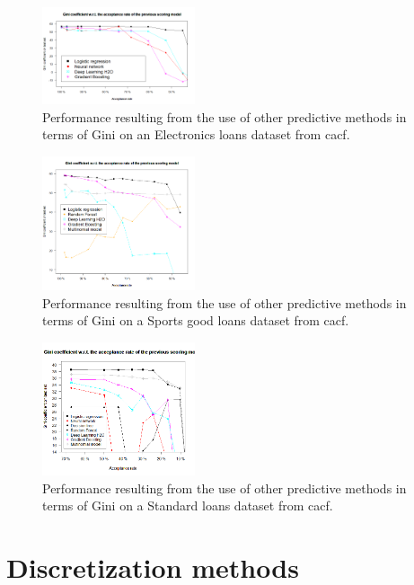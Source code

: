 \begin{figure}[H]
\centering
\includegraphics[width=0.4\textwidth]{figures/appendix/newmodelsdarty.png}
\caption{Performance resulting from the use of other predictive methods in terms of Gini on an Electronics loans dataset from \gls{cacf}.}
\label{fig:darty_othermodels}
\end{figure}

\begin{figure}[H]
\centering
\includegraphics[width=0.4\textwidth]{figures/appendix/newmodelsdecathlon.png}
\caption{Performance resulting from the use of other predictive methods in terms of Gini on a Sports good loans dataset from \gls{cacf}.}
\label{fig:decathlon_othermodels}
\end{figure}

\begin{figure}[H]
\centering
\includegraphics[width=0.4\textwidth]{figures/appendix/newmodelsm3web.png}
\caption{Performance resulting from the use of other predictive methods in terms of Gini on a Standard loans dataset from \gls{cacf}.}
\label{fig:M3_othermodels}
\end{figure}


\section{Discretization methods}

